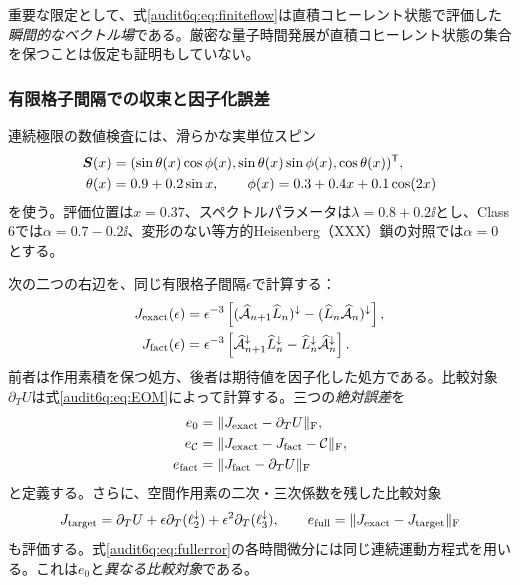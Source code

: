 重要な限定として、式\eqref{audit6q:eq:finiteflow}は直積コヒーレント状態で評価した\emph{瞬間的なベクトル場}である。厳密な量子時間発展が直積コヒーレント状態の集合を保つことは仮定も証明もしていない。

\subsubsection{有限格子間隔での収束と因子化誤差}
連続極限の数値検査には、滑らかな実単位スピン
\begin{align}
\boldsymbol S(x)&=(\sin\theta(x)\cos\phi(x),\sin\theta(x)\sin\phi(x),\cos\theta(x))^{\mathsf T},\nonumber\\
\theta(x)&=0.9+0.2\sin x,\qquad
\phi(x)=0.3+0.4x+0.1\cos(2x)
\label{audit6q:eq:profile}
\end{align}
を使う。評価位置は$x=0.37$、スペクトルパラメータは$\lambda=0.8+0.2\ii$とし、Class 6では$\alpha=0.7-0.2\ii$、変形のない等方的Heisenberg（XXX）鎖の対照では$\alpha=0$とする。

次の二つの右辺を、同じ有限格子間隔$\epsilon$で計算する：
\begin{align}
J_{\rm exact}(\epsilon)&=\epsilon^{-3}\left[
(\widehat{\mathcal A}_{n+1}\widehat L_n)^\downarrow
-(\widehat L_n\widehat{\mathcal A}_n)^\downarrow\right],\nonumber\\
J_{\rm fact}(\epsilon)&=\epsilon^{-3}\left[
\widehat{\mathcal A}_{n+1}^\downarrow\widehat L_n^\downarrow
-\widehat L_n^\downarrow\widehat{\mathcal A}_n^\downarrow\right].
\label{audit6q:eq:Jnumerical}
\end{align}
前者は作用素積を保つ処方、後者は期待値を因子化した処方である。比較対象$\partial_TU$は式\eqref{audit6q:eq:EOM}によって計算する。三つの\emph{絶対誤差}を
\begin{align}
e_0&=\|J_{\rm exact}-\partial_TU\|_{\rm F},\nonumber\\
e_{\mathcal C}&=\|J_{\rm exact}-J_{\rm fact}-\mathcal C\|_{\rm F},\nonumber\\
e_{\rm fact}&=\|J_{\rm fact}-\partial_TU\|_{\rm F}
\label{audit6q:eq:spacingerrors}
\end{align}
と定義する。さらに、空間作用素の二次・三次係数を残した比較対象
\begin{equation}
J_{\rm target}=\partial_TU+\epsilon\partial_T(\ell_2^\downarrow)
+\epsilon^2\partial_T(\ell_3^\downarrow),\qquad
e_{\rm full}=\|J_{\rm exact}-J_{\rm target}\|_{\rm F}
\label{audit6q:eq:fullerror}
\end{equation}
も評価する。式\eqref{audit6q:eq:fullerror}の各時間微分には同じ連続運動方程式を用いる。これは$e_0$と\emph{異なる比較対象}である。

